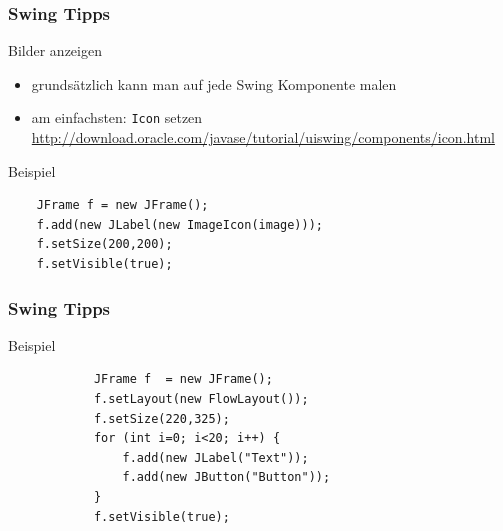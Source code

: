 \begin{frame}[fragile]
\frametitle{Swing Tipps}
\begin{block}{Bilder anzeigen}
\begin{itemize}
\item grundsätzlich kann man auf jede Swing Komponente malen \pause
\item am einfachsten: \texttt{Icon} setzen \\
\url{http://download.oracle.com/javase/tutorial/uiswing/components/icon.html}  \pause
\end{itemize}
\end{block}

\begin{block}{Beispiel}
\begin{lstlisting}
	JFrame f = new JFrame();
	f.add(new JLabel(new ImageIcon(image)));
	f.setSize(200,200);
	f.setVisible(true);
\end{lstlisting}
\end{block}
\end{frame}

\begin{frame}[fragile]
\frametitle{Swing Tipps}
\begin{block}{Beispiel}
\begin{lstlisting}
			JFrame f  = new JFrame();
			f.setLayout(new FlowLayout());
			f.setSize(220,325);
			for (int i=0; i<20; i++) {
				f.add(new JLabel("Text"));
				f.add(new JButton("Button"));
			}
			f.setVisible(true);
\end{lstlisting}
\end{block}
\end{frame}


